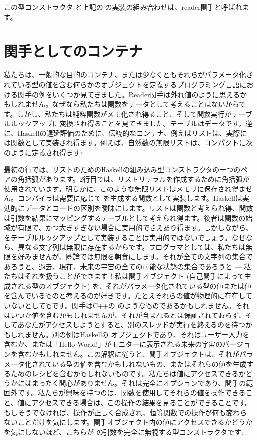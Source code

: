 この型コンストラクタ  と上記の  の実装の組み合わせは、reader関手と呼ばれます。

\section{関手としてのコンテナ}

私たちは、一般的な目的のコンテナ、または少なくともそれらがパラメータ化されている型の値を含む何らかのオブジェクトを定義するプログラミング言語における関手の例をいくつか見てきました。Reader関手は外れ値のように思えるかもしれません。なぜなら私たちは関数をデータとして考えることはないからです。しかし、私たちは純粋関数がメモ化され得ること、そして関数実行がテーブルルックアップに変換され得ることを見てきました。テーブルはデータです。逆に、Haskellの遅延評価のために、伝統的なコンテナ、例えばリストは、実際には関数として実装され得ます。例えば、自然数の無限リストは、コンパクトに次のように定義され得ます: 

最初の行では、リストのためのHaskellの組み込み型コンストラクタの一つのペアの角括弧があります。2行目では、リストリテラルを作成するために角括弧が使用されています。明らかに、このような無限リストはメモリに保存され得ません。コンパイラは需要に応じて  を生成する関数として実装します。Haskellは実効的にデータとコードの区別を曖昧にします。リストは関数と考えられ得、関数は引数を結果にマッピングするテーブルとして考えられ得ます。後者は関数の始域が有限で、かつ大きすぎない場合に実用的でさえあり得ます。しかしながら、 をテーブルルックアップとして実装することは実用的ではないでしょう。なぜなら、異なる文字列は無限に存在するからです。プログラマとしては、私たちは無限を好みませんが、圏論では無限を朝食にします。それが全ての文字列の集合であろうと、過去、現在、未来の宇宙の全ての可能な状態の集合であろうと --- 私たちはそれを扱うことができます！私は関手オブジェクト (自己関手によって生成される型のオブジェクト) を、それがパラメータ化されている型の値または値を含んでいるものと考えるのが好きです。たとえそれらの値が物理的に存在していないとしてもです。関手はC++の  のようなものであるかもしれません。それはいつか値を含むかもしれませんが、それが含まれるとは保証されておらず、そしてあなたがアクセスしようとすると、別のスレッドが実行を終えるのを待つかもしれません。別の例はHaskellの  オブジェクトであり、それはユーザー入力を含むか、または「Hello World!」がモニターに表示される未来の宇宙のバージョンを含むかもしれません。この解釈に従うと、関手オブジェクトは、それがパラメータ化されている型の値を含むかもしれないもの、またはそれらの値を生成するためのレシピを含むかもしれないものです。私たちは値にアクセスできるかどうかにはまったく関心がありません。それは完全にオプションであり、関手の範囲外です。私たちが興味を持つのは、関数を使用してそれらの値を操作できること、値にアクセスできる場合は、この操作の結果を見ることができることです。もしそうでなければ、操作が正しく合成され、恒等関数での操作が何も変わらないことだけを気にします。関手オブジェクト内の値にアクセスできるかどうかを気にしないほど、こちらが  の引数を完全に無視する型コンストラクタです: 


